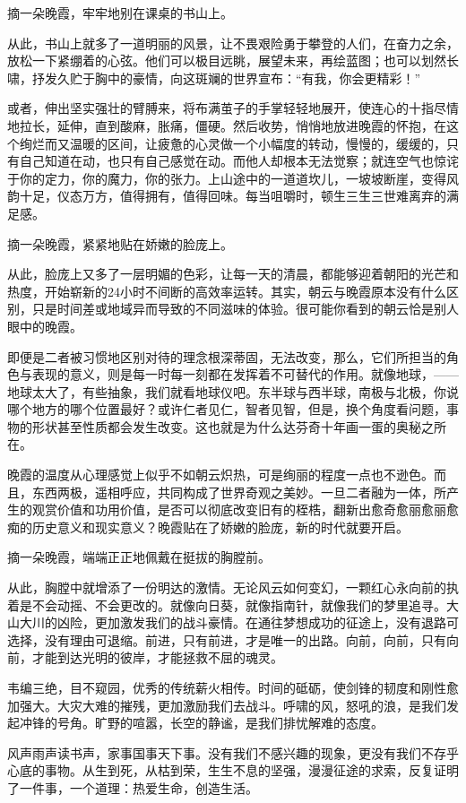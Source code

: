 \documentclass[openany]{ctexbook}
\begin{document}
摘一朵晚霞，牢牢地别在课桌的书山上。

从此，书山上就多了一道明丽的风景，让不畏艰险勇于攀登的人们，在奋力之余，放松一下紧绷着的心弦。他们可以极目远眺，展望未来，再绘蓝图；也可以划然长啸，抒发久贮于胸中的豪情，向这斑斓的世界宣布：``有我，你会更精彩！''

或者，伸出坚实强壮的臂膊来，将布满茧子的手掌轻轻地展开，使连心的十指尽情地拉长，延伸，直到酸麻，胀痛，僵硬。然后收势，悄悄地放进晚霞的怀抱，在这个绚烂而又温暖的区间，让疲惫的心灵做一个小幅度的转动，慢慢的，缓缓的，只有自己知道在动，也只有自己感觉在动。而他人却根本无法觉察；就连空气也惊诧于你的定力，你的魔力，你的张力。上山途中的一道道坎儿，一坡坡断崖，变得风韵十足，仪态万方，值得拥有，值得回味。每当咀嚼时，顿生三生三世难离弃的满足感。

摘一朵晚霞，紧紧地贴在娇嫩的脸庞上。

从此，脸庞上又多了一层明媚的色彩，让每一天的清晨，都能够迎着朝阳的光芒和热度，开始崭新的24小时不间断的高效率运转。其实，朝云与晚霞原本没有什么区别，只是时间差或地域异而导致的不同滋味的体验。很可能你看到的朝云恰是别人眼中的晚霞。

即便是二者被习惯地区别对待的理念根深蒂固，无法改变，那么，它们所担当的角色与表现的意义，则是每一时每一刻都在发挥着不可替代的作用。就像地球，------地球太大了，有些抽象，我们就看地球仪吧。东半球与西半球，南极与北极，你说哪个地方的哪个位置最好？或许仁者见仁，智者见智，但是，换个角度看问题，事物的形状甚至性质都会发生改变。这也就是为什么达芬奇十年画一蛋的奥秘之所在。

晚霞的温度从心理感觉上似乎不如朝云炽热，可是绚丽的程度一点也不逊色。而且，东西两极，遥相呼应，共同构成了世界奇观之美妙。一旦二者融为一体，所产生的观赏价值和功用价值，是否可以彻底改变旧有的桎梏，翻新出愈奇愈丽愈丽愈痴的历史意义和现实意义？晚霞贴在了娇嫩的脸庞，新的时代就要开启。

摘一朵晚霞，端端正正地佩戴在挺拔的胸膛前。

从此，胸膛中就增添了一份明达的激情。无论风云如何变幻，一颗红心永向前的执着是不会动摇、不会更改的。就像向日葵，就像指南针，就像我们的梦里追寻。大山大川的凶险，更加激发我们的战斗豪情。在通往梦想成功的征途上，没有退路可选择，没有理由可退缩。前进，只有前进，才是唯一的出路。向前，向前，只有向前，才能到达光明的彼岸，才能拯救不屈的魂灵。

韦编三绝，目不窥园，优秀的传统薪火相传。时间的砥砺，使剑锋的韧度和刚性愈加强大。大灾大难的摧残，更加激励我们去战斗。呼啸的风，怒吼的浪，是我们发起冲锋的号角。旷野的喧嚣，长空的静谧，是我们排忧解难的态度。

风声雨声读书声，家事国事天下事。没有我们不感兴趣的现象，更没有我们不存乎心底的事物。从生到死，从枯到荣，生生不息的坚强，漫漫征途的求索，反复证明了一件事，一个道理：热爱生命，创造生活。
\end{document}
